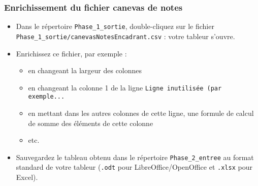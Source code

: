 \documentclass[11pt]{article}
\begin{document}
\subsubsection{Enrichissement du fichier canevas de notes}
\label{sec-4-3-3}
\begin{itemize}
\item Dans le répertoire \verb~Phase_1_sortie~, double-cliquez sur le fichier
\verb~Phase_1_sortie/canevasNotesEncadrant.csv~ : votre tableur s'ouvre.
\item Enrichissez ce fichier, par exemple :
\begin{itemize}
\item en changeant la largeur des colonnes
\item en changeant la colonne 1 de la ligne \verb~Ligne inutilisée (par     exemple...~
\item en mettant dans les autres colonnes de cette ligne, une formule de
calcul de somme des éléments de cette colonne
\item etc.
\end{itemize}
\item Sauvegardez le tableau obtenu dans le répertoire \verb~Phase_2_entree~ au
format standard de votre tableur (\verb~.odt~ pour LibreOffice/OpenOffice
et \verb~.xlsx~ pour Excel).
\end{itemize}
\end{document}
